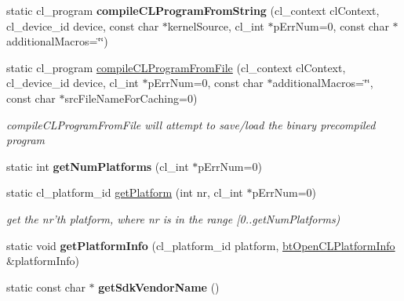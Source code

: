 \begin{DoxyCompactItemize}
\item 
\hypertarget{classbt_open_c_l_utils_a3f39a537436dd5d9164055b65e077dbf}{static cl\+\_\+program {\bfseries compile\+C\+L\+Program\+From\+String} (cl\+\_\+context cl\+Context, cl\+\_\+device\+\_\+id device, const char $\ast$kernel\+Source, cl\+\_\+int $\ast$p\+Err\+Num=0, const char $\ast$additional\+Macros=\char`\"{}\char`\"{})}\label{classbt_open_c_l_utils_a3f39a537436dd5d9164055b65e077dbf}

\item 
static cl\+\_\+program \hyperlink{classbt_open_c_l_utils_a25ddd89126ef9eaadf3a1f72d240dd7d}{compile\+C\+L\+Program\+From\+File} (cl\+\_\+context cl\+Context, cl\+\_\+device\+\_\+id device, cl\+\_\+int $\ast$p\+Err\+Num=0, const char $\ast$additional\+Macros=\char`\"{}\char`\"{}, const char $\ast$src\+File\+Name\+For\+Caching=0)
\begin{DoxyCompactList}\small\item\em compile\+C\+L\+Program\+From\+File will attempt to save/load the binary precompiled program \end{DoxyCompactList}\item 
\hypertarget{classbt_open_c_l_utils_a28c6008151f5fce1b9558b26bf3f3205}{static int {\bfseries get\+Num\+Platforms} (cl\+\_\+int $\ast$p\+Err\+Num=0)}\label{classbt_open_c_l_utils_a28c6008151f5fce1b9558b26bf3f3205}

\item 
\hypertarget{classbt_open_c_l_utils_a07a099da8acaf4c43e495b256777cff0}{static cl\+\_\+platform\+\_\+id \hyperlink{classbt_open_c_l_utils_a07a099da8acaf4c43e495b256777cff0}{get\+Platform} (int nr, cl\+\_\+int $\ast$p\+Err\+Num=0)}\label{classbt_open_c_l_utils_a07a099da8acaf4c43e495b256777cff0}

\begin{DoxyCompactList}\small\item\em get the nr'th platform, where nr is in the range \mbox{[}0..get\+Num\+Platforms) \end{DoxyCompactList}\item 
\hypertarget{classbt_open_c_l_utils_a7654b04eeba31cd0a74b6b86cebceb6f}{static void {\bfseries get\+Platform\+Info} (cl\+\_\+platform\+\_\+id platform, \hyperlink{structbt_open_c_l_platform_info}{bt\+Open\+C\+L\+Platform\+Info} \&platform\+Info)}\label{classbt_open_c_l_utils_a7654b04eeba31cd0a74b6b86cebceb6f}

\item 
\hypertarget{classbt_open_c_l_utils_abde09d4ed50967e11ccce5afa0b1da35}{static const char $\ast$ {\bfseries get\+Sdk\+Vendor\+Name} ()}\label{classbt_open_c_l_utils_abde09d4ed50967e11ccce5afa0b1da35}


\end{DoxyCompactItemize}
